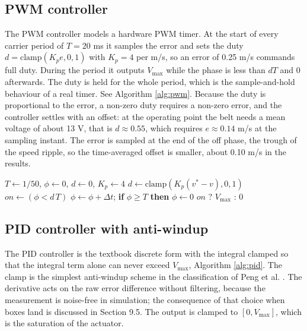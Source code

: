 \documentclass[12pt,a4paper]{article}
\begin{document}
\subsection{PWM controller}

The PWM controller models a hardware PWM timer. At the start of every carrier period of $T = 20$ ms it samples the error and sets the duty $d = \text{clamp}(K_p e, 0, 1)$ with $K_p = 4$ per m/s, so an error of 0.25 m/s commands full duty. During the period it outputs $V_{\max}$ while the phase is less than $dT$ and 0 afterwards. The duty is held for the whole period, which is the sample-and-hold behaviour of a real timer. See Algorithm \ref{alg:pwm}. Because the duty is proportional to the error, a non-zero duty requires a non-zero error, and the controller settles with an offset: at the operating point the belt needs a mean voltage of about 13 V, that is $d \approx 0.55$, which requires $e \approx 0.14$ m/s at the sampling instant. The error is sampled at the end of the off phase, the trough of the speed ripple, so the time-averaged offset is smaller, about 0.10 m/s in the results.

\begin{algorithm}[htbp]
\caption{Proportional-duty PWM control}
\label{alg:pwm}
\begin{algorithmic}[1]
\State $T \gets 1/50$, $\phi \gets 0$, $d \gets 0$, $K_p \gets 4$
   $d \gets \text{clamp}(K_p (v^* - v), 0, 1)$ \EndIf
  \State $on \gets (\phi < d\,T)$
  \State $\phi \gets \phi + \Delta t$; \textbf{if} $\phi \ge T$ \textbf{then} $\phi \gets 0$
  \State \Return $on$ ? $V_{\max}$ : $0$
\EndProcedure
\end{algorithmic}
\end{algorithm}

\subsection{PID controller with anti-windup}

The PID controller is the textbook discrete form with the integral clamped so that the integral term alone can never exceed $V_{\max}$, Algorithm \ref{alg:pid}. The clamp is the simplest anti-windup scheme in the classification of Peng et al. \cite{peng}. The derivative acts on the raw error difference without filtering, because the measurement is noise-free in simulation; the consequence of that choice when boxes land is discussed in Section 9.5. The output is clamped to $[0, V_{\max}]$, which is the saturation of the actuator.
\end{document}
